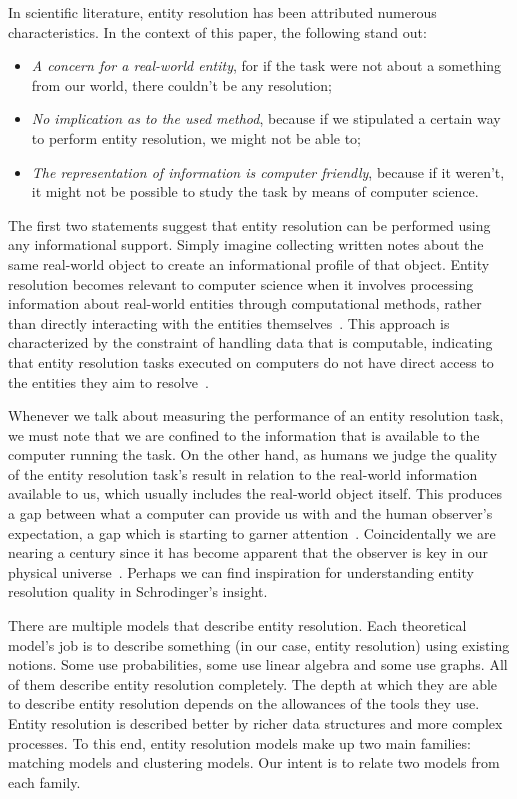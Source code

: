 In scientific literature, entity resolution has been attributed numerous
characteristics\cite{Tal11,Pap19}.
In the context of this paper, the following stand out:

\begin{itemize}
    \item\textit{A concern for a real-world entity}, for if the task were
    not about a something from our world, there couldn't be any resolution;
    \item\textit{No implication as to the used method}, because if we
    stipulated a certain way to perform entity resolution, we might not be
    able to;
    \item\textit{The representation of information is computer friendly},
    because if it weren't, it might not be possible to study the task by
    means of computer science.
\end{itemize}

The first two statements suggest that entity resolution can be performed
using any informational support.
Simply imagine collecting written notes about the same real-world object to
create an informational profile of that object.
Entity resolution becomes relevant to computer science when it involves
processing information about real-world entities through computational
methods, rather than directly interacting with the entities
themselves~\cite{Tal11}.
This approach is characterized by the constraint of handling data that is
computable, indicating that entity resolution tasks executed on computers
do not have direct access to the entities they aim to resolve~\cite{Chen09}.

Whenever we talk about measuring the performance of an entity resolution
task, we must note that we are confined to the information that is available
to the computer running the task.
On the other hand, as humans we judge the quality of the entity resolution
task's result in relation to the real-world information available to us, which
usually includes the real-world object itself.
This produces a gap between what a computer can provide us with and the human
observer's expectation, a gap which is starting to garner attention~\cite{wang2022realideal}.
Coincidentally we are nearing a century since it has become apparent that the
observer is key in our physical universe~\cite{schrodinger1926}.
Perhaps we can find inspiration for understanding entity resolution quality in
Schrodinger's insight.

There are multiple models that describe entity resolution.
Each theoretical model's job is to describe something (in our case, entity
resolution) using existing notions.
Some use probabilities, some use linear algebra and some use graphs.
All of them describe entity resolution completely.
The depth at which they are able to describe entity resolution depends on the
allowances of the tools they use.
Entity resolution is described better by richer data structures and more complex
processes.
To this end, entity resolution models make up two main families: matching models
and clustering models.
Our intent is to relate two models from each family.


